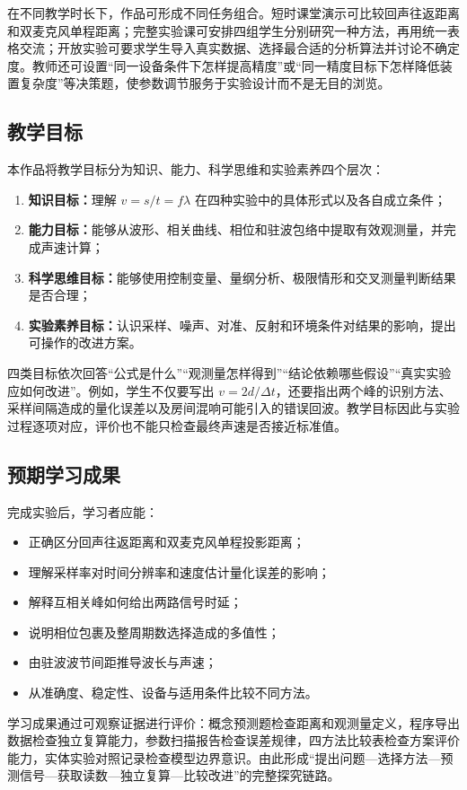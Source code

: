 \documentclass[UTF8,a4paper,zihao=-4]{ctexart}
\begin{document}
在不同教学时长下，作品可形成不同任务组合。短时课堂演示可比较回声往返距离和双麦克风单程距离；完整实验课可安排四组学生分别研究一种方法，再用统一表格交流；开放实验可要求学生导入真实数据、选择最合适的分析算法并讨论不确定度。教师还可设置“同一设备条件下怎样提高精度”或“同一精度目标下怎样降低装置复杂度”等决策题，使参数调节服务于实验设计而不是无目的浏览。

\subsection{教学目标}
本作品将教学目标分为知识、能力、科学思维和实验素养四个层次：
\begin{enumerate}
  \item \textbf{知识目标：}理解 $v=s/t=f\lambda$ 在四种实验中的具体形式以及各自成立条件；
  \item \textbf{能力目标：}能够从波形、相关曲线、相位和驻波包络中提取有效观测量，并完成声速计算；
  \item \textbf{科学思维目标：}能够使用控制变量、量纲分析、极限情形和交叉测量判断结果是否合理；
  \item \textbf{实验素养目标：}认识采样、噪声、对准、反射和环境条件对结果的影响，提出可操作的改进方案。
\end{enumerate}

四类目标依次回答“公式是什么”“观测量怎样得到”“结论依赖哪些假设”“真实实验应如何改进”。例如，学生不仅要写出 $v=2d/\Delta t$，还要指出两个峰的识别方法、采样间隔造成的量化误差以及房间混响可能引入的错误回波。教学目标因此与实验过程逐项对应，评价也不能只检查最终声速是否接近标准值。

\subsection{预期学习成果}
完成实验后，学习者应能：
\begin{itemize}
  \item 正确区分回声往返距离和双麦克风单程投影距离；
  \item 理解采样率对时间分辨率和速度估计量化误差的影响；
  \item 解释互相关峰如何给出两路信号时延；
  \item 说明相位包裹及整周期数选择造成的多值性；
  \item 由驻波波节间距推导波长与声速；
  \item 从准确度、稳定性、设备与适用条件比较不同方法。
\end{itemize}

学习成果通过可观察证据进行评价：概念预测题检查距离和观测量定义，程序导出数据检查独立复算能力，参数扫描报告检查误差规律，四方法比较表检查方案评价能力，实体实验对照记录检查模型边界意识。由此形成“提出问题—选择方法—预测信号—获取读数—独立复算—比较改进”的完整探究链路。
\end{document}
